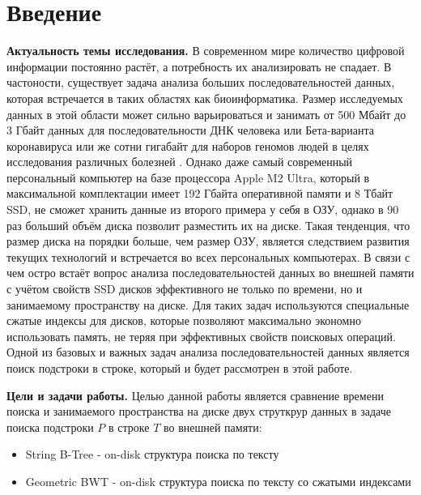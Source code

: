 \documentclass[a4paper,12pt]{article}
\begin{document}
\newpage

\tableofcontents

\newpage

\section{Введение}

\textbf{Актуальность темы исследования.} В современном мире количество цифровой информации постоянно растёт, а потребность их анализировать не спадает. В частоности, существует задача анализа больших последовательностей данных, которая встречается в таких областях как биоинформатика. Размер исследуемых данных в этой области может сильно варьироваться и занимать от 500 Мбайт до 3 Гбайт данных для последовательности ДНК человека или Бета-варианта коронавируса \cite{BLAST} или же сотни гигабайт для наборов геномов людей в целях исследования различных болезней \cite{1000HumanGenom}. Однако даже самый современный персональный компьютер на базе процессора Apple M2 Ultra\cite{Apple192Gb}, который в максимальной комплектации имеет 192 Гбайта оперативной памяти и 8 Тбайт SSD, не сможет хранить данные из второго примера у себя в ОЗУ, однако в 90 раз больший объём диска позволит разместить их на диске. Такая тенденция, что размер диска на порядки больше, чем размер ОЗУ, является следствием развития текущих технологий и встречается во всех персональных компьютерах. В связи с чем остро встаёт вопрос анализа последовательностей данных во внешней памяти с учётом свойств SSD дисков \cite{cobb2012nvm} \cite{agrawal2008design} эффективного не только по времени, но и занимаемому пространству на диске. Для таких задач используются специальные сжатые индексы для дисков, которые позволяют максимально экономно использовать память, не теряя при эффективных свойств поисковых операций. Одной из базовых и важных задач анализа последовательностей данных является поиск подстроки в строке, который и будет рассмотрен в этой работе.

\textbf{Цели и задачи работы.} Целью данной работы является сравнение времени поиска и занимаемого пространства на диске двух струткрур данных в задаче поиска подстроки $P$ в строке $T$ во внешней памяти: 
\begin{itemize}
    \item String B-Tree - on-disk структура поиска по тексту
    \item Geometric BWT - on-disk структура поиска по тексту со сжатыми индексами
\end{itemize}
\end{document}
